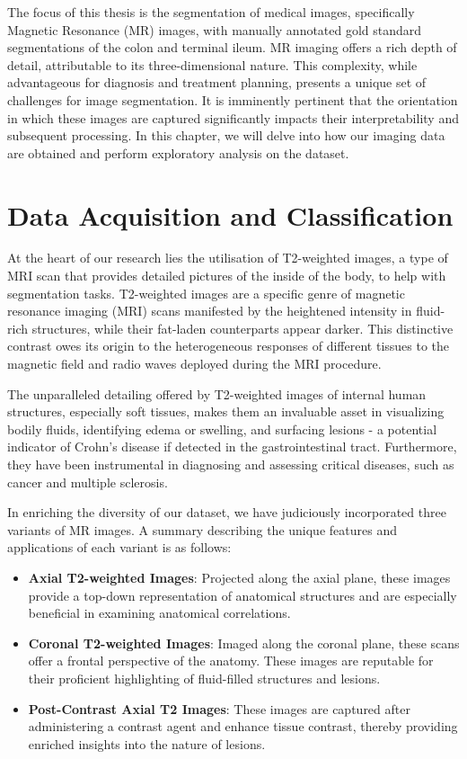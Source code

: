 
The focus of this thesis is the segmentation of medical images, specifically Magnetic Resonance (MR) images, with manually annotated gold standard segmentations of the colon and terminal ileum. MR imaging offers a rich depth of detail, attributable to its three-dimensional nature. This complexity, while advantageous for diagnosis and treatment planning, presents a unique set of challenges for image segmentation. It is imminently pertinent that the orientation in which these images are captured significantly impacts their interpretability and subsequent processing. In this chapter, we will delve into how our imaging data are obtained and perform exploratory analysis on the dataset.

\section{Data Acquisition and Classification}

At the heart of our research lies the utilisation of T2-weighted images, a type of MRI scan that provides detailed pictures of the inside of the body, to help with segmentation tasks. T2-weighted images are a specific genre of magnetic resonance imaging (MRI) scans manifested by the heightened intensity in fluid-rich structures, while their fat-laden counterparts appear darker. This distinctive contrast owes its origin to the heterogeneous responses of different tissues to the magnetic field and radio waves deployed during the MRI procedure.

The unparalleled detailing offered by T2-weighted images of internal human structures, especially soft tissues, makes them an invaluable asset in visualizing bodily fluids, identifying edema or swelling, and surfacing lesions - a potential indicator of Crohn's disease if detected in the gastrointestinal tract. Furthermore, they have been instrumental in diagnosing and assessing critical diseases, such as cancer and multiple sclerosis.

In enriching the diversity of our dataset, we have judiciously incorporated three variants of MR images. A summary describing the unique features and applications of each variant is as follows:

\begin{itemize}
    \item \textbf{Axial T2-weighted Images}: Projected along the axial plane, these images provide a top-down representation of anatomical structures and are especially beneficial in examining anatomical correlations.
    \item \textbf{Coronal T2-weighted Images}: Imaged along the coronal plane, these scans offer a frontal perspective of the anatomy. These images are reputable for their proficient highlighting of fluid-filled structures and lesions.
    \item \textbf{Post-Contrast Axial T2 Images}: These images are captured after administering a contrast agent and enhance tissue contrast, thereby providing enriched insights into the nature of lesions.
\end{itemize}


